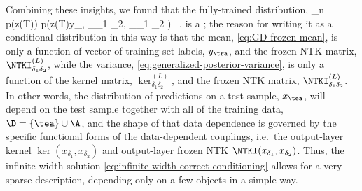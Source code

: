 \ei
Combining these insights, we found that the fully-trained distribution,
\be\label{eq:infinite-width-correct-conditioning}
\lim_{n \to \infty}p\Big(z(T)\Big) \equiv p\!\le(z(T)\Big\vert y_{\tra}, \ker_{\delta_1 \delta_2}, \NTKI_{\delta_1 \delta_2} \ri) \, ,
\ee
is a ; the reason for writing it as a conditional distribution in this way is that the mean, \eqref{eq:GD-frozen-mean}, is only a function of vector of training set labels, $y_{\tra}$, and the frozen NTK matrix, $\NTKI^{(L)}_{\delta_1 \delta_2}$, while the variance, \eqref{eq:generalized-posterior-variance}, is only a function of  the kernel matrix, $\ker^{(L)}_{\delta_1 \delta_2}$, and the frozen NTK matrix, $\NTKI^{(L)}_{\delta_1 \delta_2}$. 
In other words,
the distribution of 
predictions on a test sample, $x_{\tea}$,  
will depend on the test sample together with all of the training data, $\D = \{\tea\} \cup \A$, and 
the shape of that
data dependence is governed  by the specific functional forms of the data-dependent couplings, i.e.~the output-layer kernel  $\ker(x_{\delta_1}, x_{\delta_2})$  and output-layer frozen NTK 
$\NTKI(x_{\delta_1}, x_{\delta_2})$.
Thus, the infinite-width solution \eqref{eq:infinite-width-correct-conditioning} allows for a very sparse description, depending only on a few objects in a simple way.











